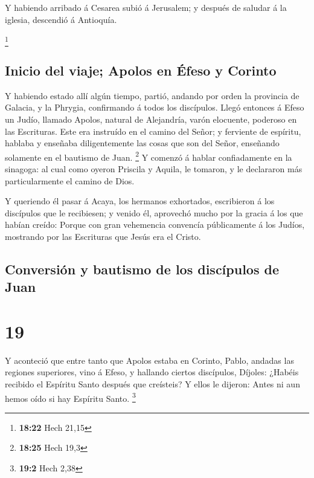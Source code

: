  Y habiendo arribado á Cesarea subió á Jerusalem; y después
de saludar á la iglesia, descendió á Antioquía.

\footnote{\textbf{18:22} Hech 21,15}

\hypertarget{inicio-del-viaje-apolos-en-uxe9feso-y-corinto}{%
\subsection{Inicio del viaje; Apolos en Éfeso y
Corinto}\label{inicio-del-viaje-apolos-en-uxe9feso-y-corinto}}

 Y habiendo estado allí algún tiempo, partió, andando por
orden la provincia de Galacia, y la Phrygia, confirmando á todos los
discípulos.  Llegó entonces á Efeso un Judío, llamado
Apolos, natural de Alejandría, varón elocuente, poderoso en las
Escrituras.  Este era instruído en el camino del Señor; y
ferviente de espíritu, hablaba y enseñaba diligentemente las cosas que
son del Señor, enseñando solamente en el bautismo de Juan. \footnote{\textbf{18:25}
  Hech 19,3}  Y comenzó á hablar confiadamente en la
sinagoga: al cual como oyeron Priscila y Aquila, le tomaron, y le
declararon más particularmente el camino de Dios.

 Y queriendo él pasar á Acaya, los hermanos exhortados,
escribieron á los discípulos que le recibiesen; y venido él, aprovechó
mucho por la gracia á los que habían creído:  Porque con
gran vehemencia convencía públicamente á los Judíos, mostrando por las
Escrituras que Jesús era el Cristo.

\hypertarget{conversiuxf3n-y-bautismo-de-los-discuxedpulos-de-juan}{%
\subsection{Conversión y bautismo de los discípulos de
Juan}\label{conversiuxf3n-y-bautismo-de-los-discuxedpulos-de-juan}}

\hypertarget{section-18}{%
\section{19}\label{section-18}}

 Y aconteció que entre tanto que Apolos estaba en Corinto,
Pablo, andadas las regiones superiores, vino á Efeso, y hallando ciertos
discípulos,  Díjoles: ¿Habéis recibido el Espíritu Santo
después que creísteis? Y ellos le dijeron: Antes ni aun hemos oído si
hay Espíritu Santo. \footnote{\textbf{19:2} Hech 2,38}

